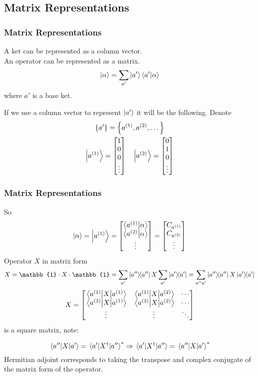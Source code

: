 \subsection{Matrix Representations}
\begin{frame}
	\frametitle{Matrix Representations}
	A ket can be represented as a column vector.\\
	An operator can be represented as a matrix.
	\[
		\ket \alpha = \sum_{a'} \ket{a'} \ip{a'}{\alpha}
	\]
	where $a'$ is a base ket.

	If we use a column vector to represent $\ket{a'}$ it will be the following. Denote
	\begin{gather*}
		\qty{a'} = \qty{a^{(1)},a^{(2)},\dots}\\
		\ket{a^{(1)}} = \mqty[1 \\ 0 \\ 0 \\ \vdots] \quad \ket{a^{(2)}} = \mqty[0 \\ 1 \\ 0 \\ \vdots]
	\end{gather*}

\end{frame}
\begin{frame}
	\frametitle{Matrix Representations}

	So
	\[
		\ket{\alpha} = \ket{a^{(1)}} = \mqty[\ip{a^{(1)}}{\alpha} \\ \ip{a^{(2)}}{\alpha} \\ \vdots] = \mqty[C_{a^{(1)}}\\C_{a^{(2)}}\\ \vdots]
	\]
	Operator $X$ in matrix form
	\[
		X = \mathbb{1} \cdot X \cdot \mathbb{1} = \sum_{a'} \op{a''} X\sum_{a'} \op{a'}  = \sum_{a'' a'} \op{a''} X \op{a'}
	\]
	\[
		X = \mqty[
			\ev{X}{a^{(1)}} & \mel{a^{(1)}}{X}{a^{(2)}} & \cdots \\
			\mel{a^{(2)}}{X}{a^{(1)}} & \ev{X}{a^{(2)}} & \cdots \\
			\vdots & \vdots & \ddots
		]
	\]
	is a square matrix, note:

	\[
		\mel{a'' }{X}{a'} = \mel{a'}{X^\dag}{a''}^* \Rightarrow \mel{a'}{X^\dag}{a''} = \mel{a''}{X}{a'}^*
	\]
	Hermitian adjoint corresponds to taking the transpose and complex conjugate of the matrix form of the operator.
\end{frame}

